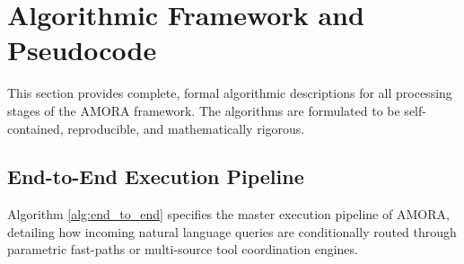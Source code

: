 \section{Algorithmic Framework and Pseudocode}
\label{sec:algorithms}

This section provides complete, formal algorithmic descriptions for all processing stages of the AMORA framework. The algorithms are formulated to be self-contained, reproducible, and mathematically rigorous.

\subsection{End-to-End Execution Pipeline}
Algorithm \ref{alg:end_to_end} specifies the master execution pipeline of AMORA, detailing how incoming natural language queries are conditionally routed through parametric fast-paths or multi-source tool coordination engines.

